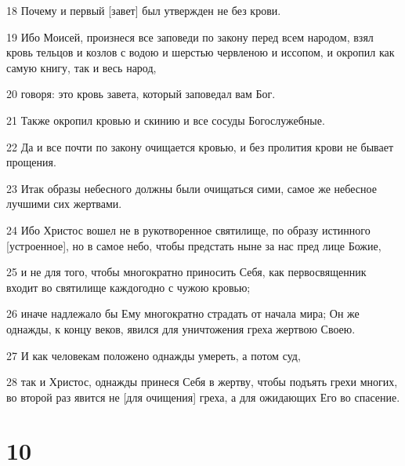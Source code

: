 \par 18 Почему и первый [завет] был утвержден не без крови.
\par 19 Ибо Моисей, произнеся все заповеди по закону перед всем народом, взял кровь тельцов и козлов с водою и шерстью червленою и иссопом, и окропил как самую книгу, так и весь народ,
\par 20 говоря: это кровь завета, который заповедал вам Бог.
\par 21 Также окропил кровью и скинию и все сосуды Богослужебные.
\par 22 Да и все почти по закону очищается кровью, и без пролития крови не бывает прощения.
\par 23 Итак образы небесного должны были очищаться сими, самое же небесное лучшими сих жертвами.
\par 24 Ибо Христос вошел не в рукотворенное святилище, по образу истинного [устроенное], но в самое небо, чтобы предстать ныне за нас пред лице Божие,
\par 25 и не для того, чтобы многократно приносить Себя, как первосвященник входит во святилище каждогодно с чужою кровью;
\par 26 иначе надлежало бы Ему многократно страдать от начала мира; Он же однажды, к концу веков, явился для уничтожения греха жертвою Своею.
\par 27 И как человекам положено однажды умереть, а потом суд,
\par 28 так и Христос, однажды принеся Себя в жертву, чтобы подъять грехи многих, во второй раз явится не [для очищения] греха, а для ожидающих Его во спасение.

\chapter{10}

